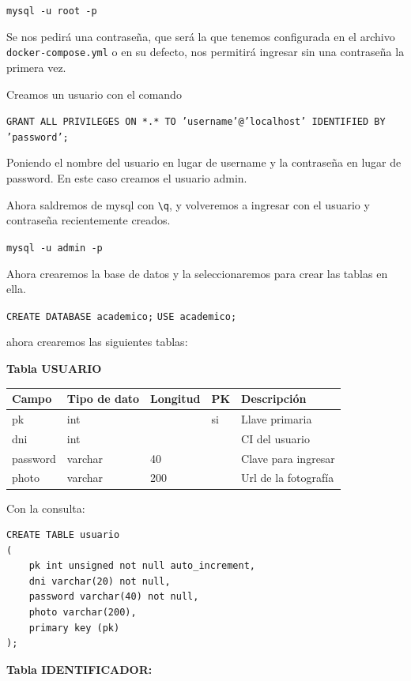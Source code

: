 \documentclass[letter]{article}
\begin{document}
\texttt{mysql -u root -p}

Se nos pedirá una contraseña, que será la que tenemos configurada en el archivo
\texttt{docker-compose.yml} o en su defecto, nos permitirá ingresar sin una contraseña
la primera vez.

Creamos un usuario con el comando

\texttt{GRANT ALL PRIVILEGES ON *.* TO 'username'@'localhost' IDENTIFIED BY 'password';}

Poniendo el nombre del usuario en lugar de \guillemotleft{}username\guillemotright{} y la contraseña en lugar
de \guillemotleft{}password\guillemotright{}. En este caso creamos el usuario admin.

Ahora saldremos de mysql con \texttt{\textbackslash{}q}, y volveremos a ingresar con el usuario y
contraseña recientemente creados.

\texttt{mysql -u admin -p}

Ahora crearemos la base de datos y la seleccionaremos para crear las tablas en
ella.

\texttt{CREATE DATABASE academico;}
\texttt{USE academico;}

ahora crearemos las siguientes tablas:

\textbf{Tabla USUARIO}

\begin{center}
\begin{tabular}{lllll}
Campo & Tipo de dato & Longitud & PK & Descripción\\
\hline
pk & int &  & si & Llave primaria\\
dni & int &  &  & CI del usuario\\
password & varchar & 40 &  & Clave para ingresar\\
photo & varchar & 200 &  & Url de la fotografía\\
\end{tabular}
\end{center}

Con la consulta:

\begin{verbatim}
CREATE TABLE usuario
(
    pk int unsigned not null auto_increment,
    dni varchar(20) not null,
    password varchar(40) not null,
    photo varchar(200),
    primary key (pk)
);
\end{verbatim}

\textbf{Tabla IDENTIFICADOR:}
\end{document}
